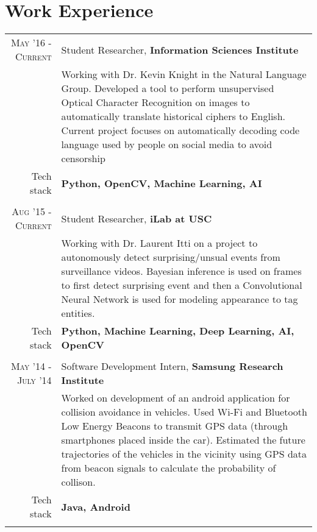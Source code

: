\section{Work Experience}
\renewcommand{\arraystretch}{0.85}%
\begin{tabular}{r|p{13cm}}
\textsc{May '16 - Current} & Student Researcher, \textbf{Information Sciences Institute} \\
& \small{Working with Dr. Kevin Knight in the Natural Language Group. Developed a tool to perform unsupervised Optical Character Recognition on images to automatically translate historical ciphers to English. Current project focuses on automatically decoding code language used by people on social media to avoid censorship}\\
\small{Tech stack} &\footnotesize{\textbf{Python, OpenCV, Machine Learning, AI}} \\
\multicolumn{2}{c}{} \\

\textsc{Aug '15 - Current} & Student Researcher, \textbf{iLab at USC} \\
& \small{Working with Dr. Laurent Itti on a project to autonomously detect surprising/unsual events from surveillance videos. Bayesian inference is used on frames to first detect surprising event and then a Convolutional Neural Network is used for modeling appearance to tag entities.}\\
\small{Tech stack} &\footnotesize{\textbf{Python, Machine Learning, Deep Learning, AI, OpenCV}} \\
\multicolumn{2}{c}{} \\

\textsc{May '14 - July '14 } & Software Development Intern, \textbf{Samsung Research Institute} \\
& \small{Worked on development of an android application for collision avoidance in vehicles. Used Wi-Fi and Bluetooth Low Energy Beacons to transmit GPS data (through smartphones placed inside the car). Estimated the future trajectories of the vehicles in the vicinity using GPS data from beacon signals to calculate the probability of collison.}\\
\small{Tech stack} &\footnotesize{\textbf{Java, Android}} \\
\multicolumn{2}{c}{}



\end{tabular}
